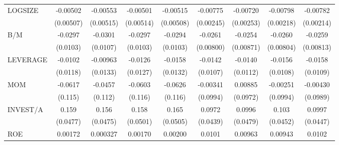 \begin{table}[htbp]
\begin{tabular}{l*{8}{c}}
LOGSIZE             &    -0.00502         &    -0.00553         &    -0.00501         &    -0.00515         &    -0.00775\sym{***}&    -0.00720\sym{***}&    -0.00798\sym{***}&    -0.00782\sym{***}\\
                    &   (0.00507)         &   (0.00515)         &   (0.00514)         &   (0.00508)         &   (0.00245)         &   (0.00253)         &   (0.00218)         &   (0.00214)         \\
B/M                 &     -0.0297\sym{***}&     -0.0301\sym{***}&     -0.0297\sym{***}&     -0.0294\sym{***}&     -0.0261\sym{***}&     -0.0254\sym{***}&     -0.0260\sym{***}&     -0.0259\sym{***}\\
                    &    (0.0103)         &    (0.0107)         &    (0.0103)         &    (0.0103)         &   (0.00800)         &   (0.00871)         &   (0.00804)         &   (0.00813)         \\
LEVERAGE            &     -0.0102         &    -0.00963         &     -0.0126         &     -0.0158         &     -0.0142         &     -0.0140         &     -0.0156         &     -0.0158         \\
                    &    (0.0118)         &    (0.0133)         &    (0.0127)         &    (0.0132)         &    (0.0107)         &    (0.0112)         &    (0.0108)         &    (0.0109)         \\
MOM                 &     -0.0617         &     -0.0457         &     -0.0603         &     -0.0626         &    -0.00341         &     0.00885         &    -0.00251         &    -0.00430         \\
                    &     (0.115)         &     (0.112)         &     (0.116)         &     (0.116)         &    (0.0994)         &    (0.0972)         &    (0.0994)         &    (0.0989)         \\
INVEST/A            &       0.159\sym{***}&       0.156\sym{***}&       0.158\sym{***}&       0.165\sym{***}&      0.0972\sym{**} &      0.0996\sym{**} &       0.103\sym{**} &      0.0997\sym{**} \\
                    &    (0.0477)         &    (0.0475)         &    (0.0501)         &    (0.0505)         &    (0.0439)         &    (0.0479)         &    (0.0452)         &    (0.0447)         \\
ROE                 &     0.00172         &    0.000327         &     0.00170         &     0.00200         &      0.0101         &     0.00963         &     0.00943         &      0.0102         \\

\end{tabular}
\end{table}
